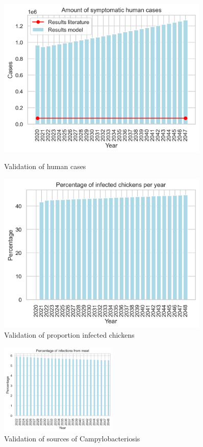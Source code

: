 \begin{figure}[!h]
    \centering
    \begin{minipage}{0.45\textwidth}
        \centering
        \includegraphics[width=0.9\textwidth]{notebooks/human_cases.png} %
        \caption{Validation of human cases}
        \label{fig:val_human_cases}
    \end{minipage}\hfill
    \begin{minipage}{0.45\textwidth}
        \centering
        \includegraphics[width=0.9\textwidth]{notebooks/chickens.png} %
        \caption{Validation of proportion infected chickens}
	    \label{fig:val_chickens}
    \end{minipage}
\end{figure}

\begin{figure}[!h]
	\centering
	\includegraphics[width=0.5\textwidth]{notebooks/source.png}
	\caption{Validation of sources of Campylobacteriosis}
	\label{fig:val_sources}
\end{figure}

